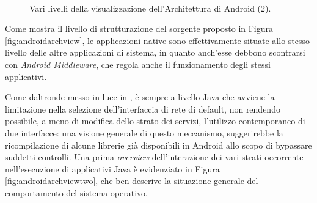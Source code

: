 \begin{figure}[thp]
\centering
{}\\
\caption{Vari livelli della visualizzazione dell'Architettura di Android (2).}
\label{fig:androidarchviewtwo}
\end{figure}

Come mostra il livello di strutturazione del sorgente proposto in Figura  \vref{fig:androidarchview},
le applicazioni native sono effettivamente situate allo stesso livello delle
altre applicazioni di sistema, in quanto anch'esse debbono scontrarsi con 
\textit{Android Middleware},
che regola anche il funzionamento degli stessi applicativi. 

Come daltronde messo in luce in \parencite{tesi:nexus}, è sempre a livello Java
che avviene la limitazione nella selezione dell'interfaccia di rete di default, non
rendendo possibile, a meno di modifica dello strato dei servizi, l'utilizzo contemporaneo di due interfacce:
una visione generale di questo meccanismo, suggerirebbe 
la ricompilazione di alcune librerie già disponibili in Android allo scopo di
bypassare suddetti controlli.
Una prima \textit{overview} dell'interazione dei vari strati occorrente nell'esecuzione
di applicativi Java è evidenziato in Figura  
\vref{fig:androidarchviewtwo},
che ben descrive la situazione generale del comportamento del sistema operativo.

